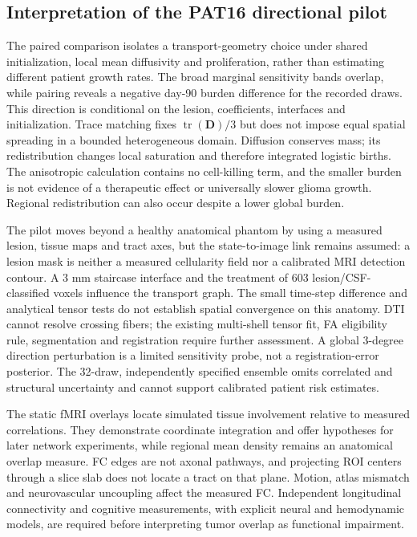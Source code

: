 \subsection{Interpretation of the PAT16 directional pilot}
The paired comparison isolates a transport-geometry choice under shared initialization, local mean diffusivity and proliferation, rather than estimating different patient growth rates. The broad marginal sensitivity bands overlap, while pairing reveals a negative day-90 burden difference for the recorded draws. This direction is conditional on the lesion, coefficients, interfaces and initialization. Trace matching fixes $\operatorname{tr}(\mathbf D)/3$ but does not impose equal spatial spreading in a bounded heterogeneous domain. Diffusion conserves mass; its redistribution changes local saturation and therefore integrated logistic births. The anisotropic calculation contains no cell-killing term, and the smaller burden is not evidence of a therapeutic effect or universally slower glioma growth. Regional redistribution can also occur despite a lower global burden.

The pilot moves beyond a healthy anatomical phantom by using a measured lesion, tissue maps and tract axes, but the state-to-image link remains assumed: a lesion mask is neither a measured cellularity field nor a calibrated MRI detection contour. A 3 mm staircase interface and the treatment of 603 lesion/CSF-classified voxels influence the transport graph. The small time-step difference and analytical tensor tests do not establish spatial convergence on this anatomy. DTI cannot resolve crossing fibers; the existing multi-shell tensor fit, FA eligibility rule, segmentation and registration require further assessment. A global 3-degree direction perturbation is a limited sensitivity probe, not a registration-error posterior. The 32-draw, independently specified ensemble omits correlated and structural uncertainty and cannot support calibrated patient risk estimates.

The static fMRI overlays locate simulated tissue involvement relative to measured correlations. They demonstrate coordinate integration and offer hypotheses for later network experiments, while regional mean density remains an anatomical overlap measure. FC edges are not axonal pathways, and projecting ROI centers through a slice slab does not locate a tract on that plane. Motion, atlas mismatch and neurovascular uncoupling affect the measured FC. Independent longitudinal connectivity and cognitive measurements, with explicit neural and hemodynamic models, are required before interpreting tumor overlap as functional impairment.

